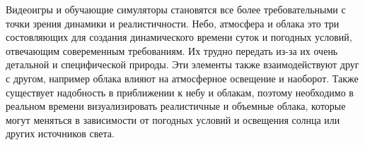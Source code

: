 \Introduction

Видеоигры и обучающие симуляторы становятся все более требовательными с точки зрения динамики и реалистичности.
Небо, атмосфера и облака это три состовляющих для создания динамического времени суток
и погодных условий, отвечающим совеременным требованиям. Их трудно передать из-за их очень
детальной и специфической природы. Эти элементы также взаимодействуют друг с другом, например облака влияют
на атмосферное освещение и наоборот. Также существует надобность в приближении к небу и облакам,
поэтому необходимо в реальном времени визуализировать реалистичные и объемные облака, которые могут меняться
в зависимости от погодных условий и освещения солнца или других источников света.

